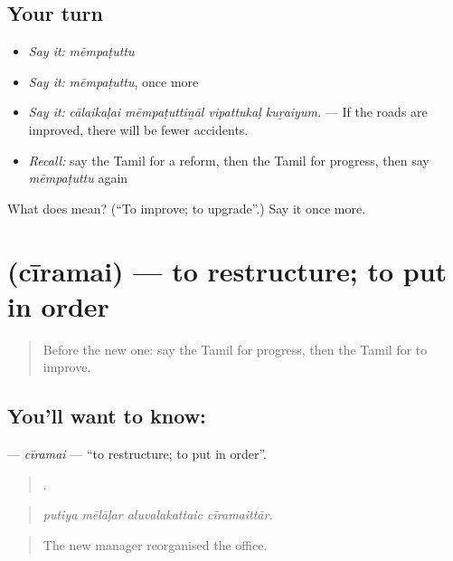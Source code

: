 \subsection*{Your turn}
\begin{itemize}
\raggedright
  \item \emph{Say it:} \emph{mēmpaṭuttu}
  \item \emph{Say it:} \emph{mēmpaṭuttu}, once more
  \item \emph{Say it:} \emph{cālaikaḷai mēmpaṭuttiṉāl vipattukaḷ kuṟaiyum.} — If the roads are improved, there will be fewer accidents.
  \item \emph{Recall:} say the Tamil for a reform, then the Tamil for progress, then say \emph{mēmpaṭuttu} again
\end{itemize}

\begin{tcolorbox}[breakable,colback=teal!4,colframe=teal!35!black,title={Before you move on}]
What does  mean? (\textquotedblleft{}To improve; to upgrade\textquotedblright{}.) Say it once more.
\end{tcolorbox}
\section[\texorpdfstring{\ta{சீரமை} (cīramai)}{சீரமை (cīramai)}]{ (cīramai) — to restructure; to put in order}

\label{lesson:TA-C390-ciramai}



\begin{quote}
Before the new one: say the Tamil for progress, then the Tamil for to improve.
\end{quote}

\subsection*{You'll want to know: }
\textbf{} — \emph{cīramai} — \textquotedblleft{}to restructure; to put in order\textquotedblright{}.

\begin{quote}
   .
\end{quote}

\begin{quote}
\emph{putiya mēlāḷar aluvalakattaic cīramaittār.}
\end{quote}

\begin{quote}
The new manager reorganised the office.
\end{quote}

